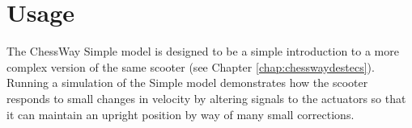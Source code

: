 \section{Usage}
The ChessWay Simple model is designed to be a simple introduction to a
more complex version of the same scooter (see Chapter
\ref{chap:chesswaydestecs}).  Running a simulation of the Simple model
demonstrates how the scooter responds to small changes in velocity by
altering signals to the actuators so that it can maintain an upright
position by way of many small corrections.
